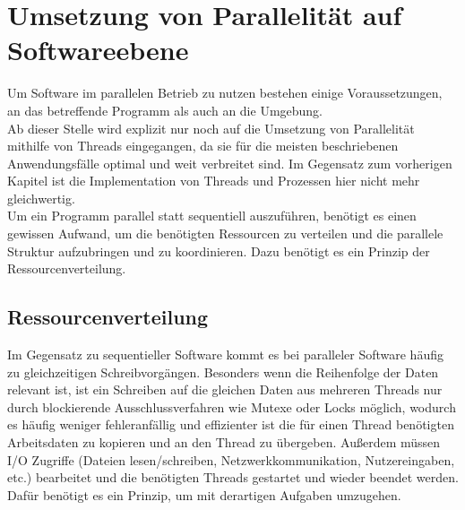 \chapter{Umsetzung von Parallelität auf Softwareebene}
Um Software im parallelen Betrieb zu nutzen bestehen einige Voraussetzungen, an das betreffende Programm als auch an die Umgebung.\\
Ab dieser Stelle wird explizit nur noch auf die Umsetzung von Parallelität mithilfe von Threads eingegangen, da sie für die meisten beschriebenen Anwendungsfälle optimal und weit verbreitet sind. Im Gegensatz zum vorherigen Kapitel ist die Implementation von Threads und Prozessen hier nicht mehr gleichwertig.\\
Um ein Programm parallel statt sequentiell auszuführen, benötigt es einen gewissen Aufwand, um die benötigten Ressourcen zu verteilen und die parallele Struktur aufzubringen und zu koordinieren. Dazu benötigt es ein Prinzip der Ressourcenverteilung.

\section{Ressourcenverteilung}
Im Gegensatz zu sequentieller Software kommt es bei paralleler Software häufig zu gleichzeitigen Schreibvorgängen. Besonders wenn die Reihenfolge der Daten relevant ist, ist ein Schreiben auf die gleichen Daten aus mehreren Threads nur durch blockierende Ausschlussverfahren wie Mutexe oder Locks möglich, wodurch es häufig weniger fehleranfällig und effizienter ist die für einen Thread benötigten Arbeitsdaten zu kopieren und an den Thread zu übergeben. Außerdem müssen \ac{I/O} Zugriffe (Dateien lesen/schreiben, Netzwerkkommunikation, Nutzereingaben, etc.) bearbeitet und die benötigten Threads gestartet und wieder beendet werden. Dafür benötigt es ein Prinzip, um mit derartigen Aufgaben umzugehen.


